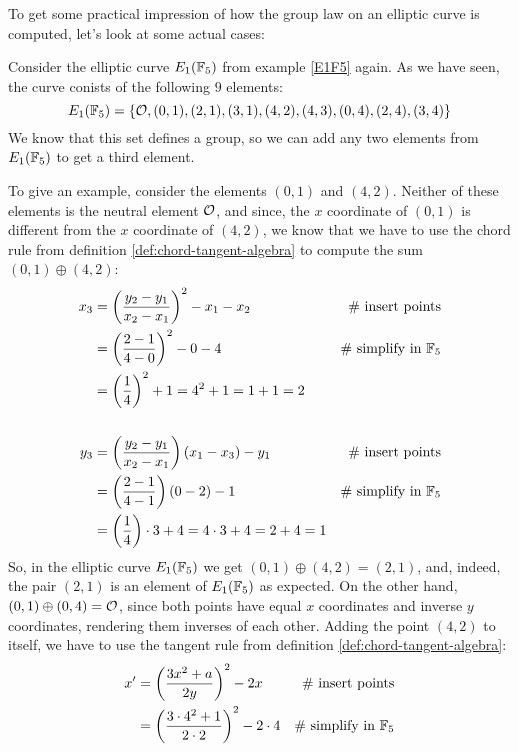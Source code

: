 To get some practical impression of how the group law on an elliptic curve is computed, let's look at some actual cases: 
\begin{example}\label{ex:01+42}
Consider the elliptic curve $E_1(\mathbb{F}_5)$ from example \ref{E1F5} again. As we have seen, the curve conists of the following $9$ elements:
$$
E_1(\mathbb{F}_5) = \{\mathcal{O}, (0,1),(2,1),(3,1),(4,2),(4,3),(0,4),(2,4),(3,4)\}
$$
We know that this set defines a group, so we can add any two elements from $E_1(\mathbb{F}_5)$ to get a third element. 

To give an example, consider the elements $(0,1)$ and $(4,2)$. Neither of these elements is the neutral element $\mathcal{O}$, and since, the $x$ coordinate of $(0,1)$ is different from the $x$ coordinate of $(4,2)$, we know that we have to use the chord rule from definition \ref{def:chord-tangent-algebra} to compute the sum $(0,1)\oplus (4,2)$:
\begin{align*}
x_3  & = \left(\frac{y_2-y_1}{x_2-x_1}\right)^2 -x_1-x_2 & \text{\# insert points}\\
     & = \left(\frac{2-1}{4-0}\right)^2 -0-4  & \text{\# simplify in } \mathbb{F}_5\\
     & = \left(\frac{1}{4}\right)^2 +1
       = 4^2 +1
       = 1 +1 
       = 2
\\
\\
y_3  & = \left(\frac{y_2-y_1}{x_2-x_1} \right)\left(x_1-x_3\right) - y_1  & \text{\# insert points}\\     
     & = \left(\frac{2-1}{4-1} \right)\left(0-2\right) - 1   & \text{\# simplify in } \mathbb{F}_5\\    
     & = \left(\frac{1}{4} \right)\cdot 3 + 4   
       = 4\cdot 3 + 4
       = 2 + 4
       = 1          
\end{align*} 
So, in the elliptic curve $E_1(\mathbb{F}_5)$ we get $(0,1)\oplus (4,2) =(2,1)$, and, indeed, the pair $(2,1)$ is an element of $E_1(\mathbb{F}_5)$ as expected. On the other hand, $(0,1)\oplus (0,4) =\mathcal{O}$, since both points have equal $x$ coordinates and inverse $y$ coordinates, rendering them inverses of each other. Adding the point $(4,2)$ to itself, we have to use the tangent rule from definition \ref{def:chord-tangent-algebra}:
\begin{align*}
x'  & = \left(\frac{3x^2+a}{2y}\right)^2 -2x   & \text{\# insert points}\\
    & = \left(\frac{3\cdot 4^2+1}{2\cdot 2}\right)^2 -2\cdot 4 & \text{\# simplify in } \F_5 \\

\end{align*}
\end{example}
